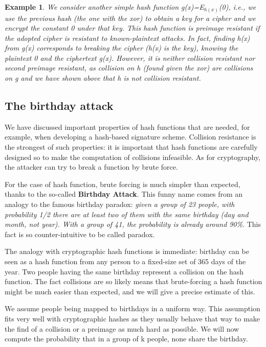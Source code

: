 \documentclass[a4paper, 12pt]{report}
\newtheorem{example}{\textbf{Example}}
\begin{document}
\begin{example}
	We consider another simple hash function g(x)=E$_{h(x)}$(0), i.e., we use the previous hash (the one with the xor) to obtain a key for a cipher and we encrypt the constant 0 under that key. This hash function is preimage resistant if the adopted cipher is resistant to known-plaintext attacks. In fact, finding h(x) from g(x) corresponds to breaking the cipher (h(x) is the key), knowing the plaintext 0 and the ciphertext g(x). However, it is neither collision resistant nor second preimage resistant, as collision on h (found given the xor) are collisions on g and we have shown above that h is not collision resistant.
\end{example}

\subsection*{The birthday attack}
We have discussed important properties of hash functions that are needed, for example, when developing a hash-based signature scheme. Collision resistance is the strongest of such properties: it is important that hash functions are carefully designed so to make the computation of collisions infeasible. As for cryptography, the attacker can try to break a function by brute force.

For the case of hash function, brute forcing is much simpler than expected, thanks to the so-called \textbf{Birthday Attack}. This funny name comes from an analogy to the famous birthday paradox: \textit{given a group of 23 people, with probability 1/2 there are at least two of them with the same birthday (day and month, not year). With a group of 41, the probability is already around 90\%}. This fact is so counter-intuitive to be called paradox.

The analogy with cryptographic hash functions is immediate: birthday can be seen as a hash function from any person to a fixed-size set of 365 days of the year. Two people having the same birthday represent a collision on the hash function. The fact collisions are so likely means that brute-forcing a hash function might be much easier than expected, and we will give a precise estimate of this.

We assume people being mapped to birthdays in a uniform way. This assumption fits very well with cryptographic hashes as they usually behave that way to make the find of a collision or a preimage as much hard as possible. We will now compute the probability that in a group of k people, none share the birthday.
\end{document}
